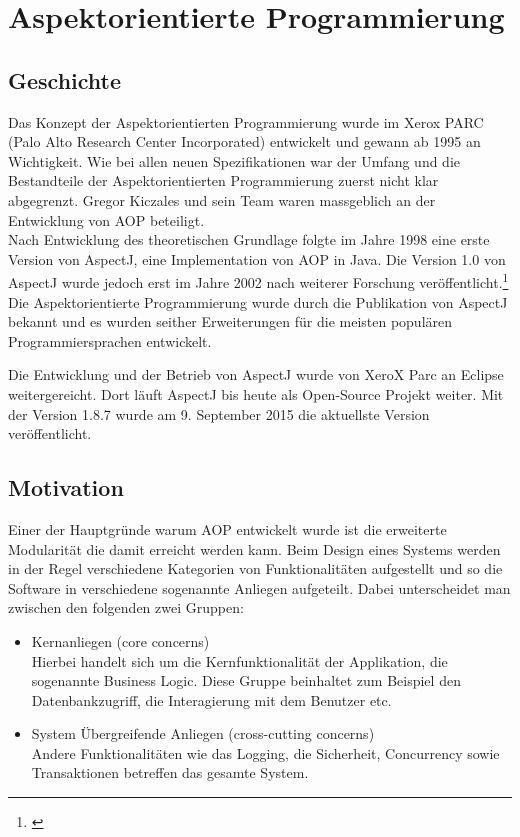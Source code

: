 \chapter{Aspektorientierte Programmierung}
\label{chap:aop}

\section{Geschichte}
\label{sec:aop_geschichte}

Das Konzept der Aspektorientierten Programmierung wurde im Xerox PARC (Palo Alto Research Center Incorporated) entwickelt und gewann ab 1995 an Wichtigkeit. Wie bei allen neuen Spezifikationen war der Umfang und die Bestandteile der Aspektorientierten Programmierung zuerst nicht klar abgegrenzt. Gregor Kiczales und sein Team waren massgeblich an der Entwicklung von AOP beteiligt.\\
Nach Entwicklung des theoretischen Grundlage folgte im Jahre 1998 eine erste Version von AspectJ, eine Implementation von AOP in Java. Die Version 1.0 von AspectJ wurde jedoch erst im Jahre 2002 nach weiterer Forschung veröffentlicht.\footnote{\cite{lopes:historyaop}} \\
Die Aspektorientierte Programmierung wurde durch die Publikation von AspectJ bekannt und es wurden seither Erweiterungen für die meisten populären Programmiersprachen entwickelt. 

Die Entwicklung und der Betrieb von AspectJ wurde von XeroX Parc an Eclipse weitergereicht. Dort läuft AspectJ bis heute als Open-Source Projekt weiter. Mit der Version 1.8.7 wurde am 9. September 2015 die aktuellste Version veröffentlicht.

\section{Motivation}
\label{sec:aop_motivation}

Einer der Hauptgründe warum AOP entwickelt wurde ist die erweiterte Modularität die damit erreicht werden kann. Beim Design eines Systems werden in der Regel verschiedene Kategorien von Funktionalitäten aufgestellt und so die Software in verschiedene sogenannte Anliegen aufgeteilt. Dabei unterscheidet man zwischen den folgenden zwei Gruppen:

\begin{itemize}
	\item Kernanliegen (core concerns)\\
	Hierbei handelt sich um die Kernfunktionalität der Applikation, die sogenannte Business Logic. Diese Gruppe beinhaltet zum Beispiel den Datenbankzugriff, die Interagierung mit dem Benutzer etc.
	\item System Übergreifende Anliegen (cross-cutting concerns) \\
	Andere Funktionalitäten wie das Logging, die Sicherheit, Concurrency sowie Transaktionen betreffen das gesamte System.
\end{itemize}

